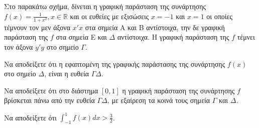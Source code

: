 Στο παρακάτω σχήμα, δίνεται η γραφική παράσταση της συνάρτησης $f(x) = \frac{1}{1+x^2}, x \in \mathbb{R}$ και οι ευθείες με εξισώσεις $x = -1$ και $x = 1$ οι οποίες τέμνουν τον μεν άξονα $x'x$ στα σημεία Α και Β αντίστοιχα, την δε γραφική παράσταση της $f$ στα σημεία Ε και $\Delta$ αντίστοιχα. Η γραφική παράσταση της $f$ τέμνει τον άξονα $y'y$ στο σημείο $\Gamma$.
\begin{alist}
\item Να αποδείξετε ότι η εφαπτομένη της γραφικής παράστασης της συνάρτησης $f(x)$ στο σημείο $\Delta$, είναι η ευθεία $\Gamma\Delta$. 
\item Να αποδείξετε ότι στο διάστημα $[0,1]$ η γραφική παράσταση της συνάρτησης $f$ βρίσκεται πάνω από την ευθεία $\Gamma\Delta$, με εξαίρεση τα κοινά τους σημεία $\Gamma$ και $\Delta$. 
\item Να αποδείξετε ότι $\int_{-1}^{1} f(x)dx > \frac{3}{2}$. 
\end{alist}